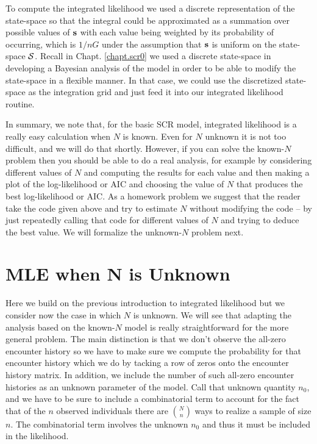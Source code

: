 To compute the integrated likelihood we used a discrete representation
of the state-space so that the integral could be approximated as a
summation over possible values of ${\bf s}$ with each value being
weighted by its probability of occurring, which is $1/nG$ under the
assumption that ${\bf s}$ is uniform on the state-space ${\cal
  S}$. Recall
in Chapt. \ref{chapt.scr0} we 
used a discrete state-space in developing a Bayesian analysis of the
model in order to be able to modify the state-space in a flexible
manner. In that case, we could use the discretized state-space as the
integration grid and just feed it into our integrated likelihood
routine. 

In summary, we note that, for the basic SCR model, integrated
likelihood is a really easy calculation when $N$ is known. Even for $N$
unknown it is not too difficult, and we will do that shortly.
However, if you can solve the known-$N$ problem then you should be able
to do a real analysis, for example by considering different values of
$N$ and computing the results for each value and then making a plot of
the log-likelihood or AIC and choosing the value of $N$ that produces
the best log-likelihood or AIC. As a homework problem we suggest that
the reader take the code given above and try to estimate $N$ without
modifying the code – by just repeatedly calling that code for
different values of $N$ and trying to deduce the best value.
We will formalize the unknown-$N$ problem next.



\section{MLE when N is Unknown} 
\label{mle.sec.Nunknown}

Here we build on the previous introduction to integrated likelihood
but we consider now the case in which $N$ is unknown. We will see that
adapting the analysis based on the known-$N$ model is really
straightforward for the more general problem. The main distinction is
that we don’t observe the all-zero encounter history so we have to
make sure we compute the probability for that encounter history which
we do by tacking a row of zeros onto the encounter history matrix. In
addition, we include the number of such all-zero encounter histories
as an unknown parameter of the model. Call that unknown quantity
$n_{0}$, and we have to be sure to include a combinatorial term to
account for the fact that of the $n$ observed individuals there are
${N \choose n}$ ways to realize a sample of size $n$. The
combinatorial term involves the unknown $n_{0}$ and thus it must be
included in the likelihood.

